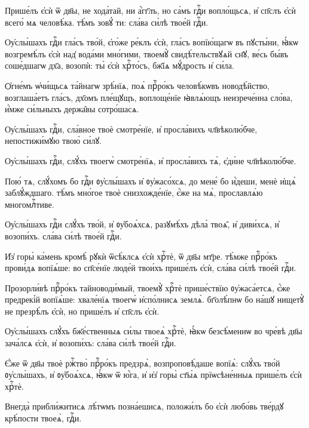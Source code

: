 \hKv Прише́лъ є҆сѝ ѿ дв҃ы, не хода́тай, ни а҆́гг҃лъ, но са́мъ  гдⷭ҇и вопло́щьсѧ, и҆ сп҃слъ є҆сѝ всего́ мѧ человѣ́ка.  тѣ́мъ зовꙋ́ ти: сла́ва си́лѣ твое́й гдⷭ҇и. 
%

\hKv Оу҆слы́шахъ гдⷭ҇и гла́съ тво́й, є҆го́же  ре́клъ є҆сѝ, гла́съ вопїю́щагѡ въ пꙋсты́ни, ꙗ҆́кѡ  возгремѣ́лъ є҆сѝ над̾ вода́ми мно́гими, твоемꙋ̀  свидѣ́тельствꙋѧй сн҃ꙋ, ве́сь бы́въ соше́дшагѡ дх҃а,  возопѝ: ты̀ є҆сѝ хрⷭ҇то́съ, бж҃їѧ мꙋ́дрость и҆ си́ла. 

\hKv Ѻ҆гне́мъ ѡ҆чи́щьсѧ та́йнагѡ зрѣ́нїѧ, поѧ̀ прⷪ҇ро́къ  человѣ́кѡвъ новодѣ́йство, возглаша́етъ гла́съ, дх҃омъ  пле́щꙋщъ, воплоще́нїе ꙗ҆влѧ́ющъ неизрече́нна сло́ва, и҆́мже  си́льныхъ держа̑вы сотро́шасѧ. 
%

\hKv Оу҆слы́шахъ гдⷭ҇и, сла́вное твоѐ смотре́нїе, и҆  просла́вихъ чл҃вѣколю́бче, непостижи́мꙋю твою̀ си́лꙋ.  
%

\hKv Оу҆слы́шахъ гдⷭ҇и, слꙋ́хъ твоегѡ̀  смотре́нїѧ, и҆ просла́вихъ тѧ̀, є҆ди́не чл҃вѣколю́бче. 

\hKv Пою́ тѧ, слꙋ́хомъ бо гдⷭ҇и ᲂу҆слы́шахъ и҆ ᲂу҆жасо́хсѧ, до  мене́ бо и҆́деши, менѐ и҆щѧ̀ заблꙋ́ждшаго. тѣ́мъ мно́гое  твоѐ снизхожде́нїе, є҆́же на мѧ̀, прославлѧ́ю  многомлⷭ҇тиве. 

\hKv Оу҆слы́шахъ гдⷭ҇и слꙋ́хъ тво́й, и҆ ᲂу҆боѧ́хсѧ, разꙋмѣ́хъ  дѣла̀ твоѧ̑, и҆ диви́хсѧ, и҆ возопи́хъ. сла́ва си́лѣ  твое́й гдⷭ҇и. 

\hKv И҆з̾ горы̀ ка́мень кромѣ̀ рꙋкѝ ѿсѣ́клсѧ є҆сѝ  хрⷭ҇тѐ, ѿ дв҃ы мт҃ре. тѣ́мже прⷪ҇ро́къ прови́дѧ  вопїѧ́ше: во сп҃се́нїе люде́й твои́хъ прише́лъ є҆сѝ,  сла́ва си́лѣ твое́й гдⷭ҇и. 

\hKv Прозорли́вѣ прⷪ҇ро́къ тайноводи́мый, твоемꙋ̀ хрⷭ҇тѐ  прише́ствїю ᲂу҆жаса́етсѧ, є҆́же предрекі́й вопїѧ́ше:  хвале́нїѧ твоегѡ̀ и҆спо́лнисѧ землѧ̀. бг҃олѣ́пнѡ бо на́шꙋ  нищетꙋ̀ не презрѣ́лъ є҆сѝ, но прише́лъ и҆ сп҃слъ є҆сѝ.   
%

\hKv Оу҆слы́шахъ слꙋ́хъ бж҃е́ственныѧ си́лы твоеѧ̀ хрⷭ҇тѐ,  ꙗ҆́кѡ безсѣ́меннѡ во чре́вѣ дв҃ы зача́лсѧ є҆сѝ, и҆  возопи́хъ: сла́ва си́лѣ твое́й гдⷭ҇и. 

\hKv Є҆́же ѿ дв҃ы твоѐ ржⷭ҇тво̀ прⷪ҇ро́къ предзрѧ̀,  возпроповѣ́даше вопїѧ̀: слꙋ́хъ тво́й ᲂу҆слы́шахъ, и҆  ᲂу҆боѧ́хсѧ, ꙗ҆́кѡ ѿ ю҆́га, и҆ и҆з̾ горы̀ ст҃ы́ѧ  прїѡсѣне́нныѧ прише́лъ є҆сѝ хрⷭ҇тѐ. 

\hKv Внегда̀ прибли́житисѧ лѣ́тѡмъ позна́ешисѧ, положи́лъ бо  є҆сѝ любо́вь тве́рдꙋ крѣ́пости твоеѧ̀, гдⷭ҇и. 

